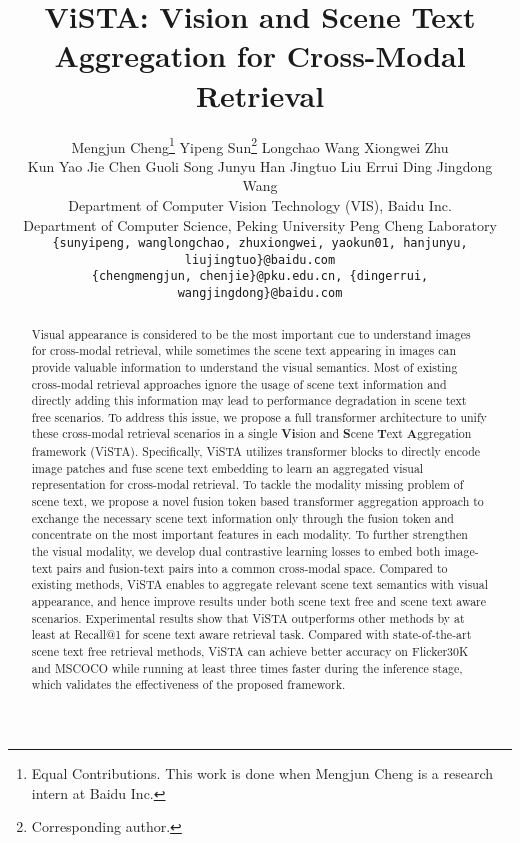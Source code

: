 \documentclass[10pt,twocolumn,letterpaper]{article}
\begin{document}
\title{ViSTA: Vision and Scene Text Aggregation for Cross-Modal Retrieval}


\makeatletter
\newcommand{\printfnsymbol}[1]{\textsuperscript{\@fnsymbol{#1}}}
\makeatother

\author{Mengjun Cheng\thanks{\noindent Equal Contributions. This work is done when Mengjun Cheng is a research intern at Baidu Inc.} \quad Yipeng Sun\printfnsymbol{1}\thanks{Corresponding author.} \quad Longchao Wang \quad Xiongwei Zhu \\
\quad Kun Yao \quad Jie Chen \quad Guoli Song \quad Junyu Han \quad Jingtuo Liu \quad Errui Ding \quad Jingdong Wang\\
Department of Computer Vision Technology (VIS), Baidu Inc. \\
\quad Department of Computer Science, Peking University \quad Peng Cheng Laboratory\\
{\tt\small \{sunyipeng, wanglongchao, zhuxiongwei, yaokun01, hanjunyu, liujingtuo\}@baidu.com}\\
{\tt\small \{chengmengjun, chenjie\}@pku.edu.cn, \tt\small \{dingerrui, wangjingdong\}@baidu.com}}
\maketitle

\begin{abstract}
Visual appearance is considered to be the most important cue to understand images for cross-modal retrieval, while sometimes the scene text appearing in images can provide valuable information to understand the visual semantics. Most of existing cross-modal retrieval approaches ignore the usage of scene text information and directly adding this information may lead to performance degradation in scene text free scenarios. To address this issue, we propose a full transformer architecture to unify these cross-modal retrieval scenarios in a single \textbf{Vi}sion and \textbf{S}cene \textbf{T}ext \textbf{A}ggregation framework (ViSTA). Specifically, ViSTA utilizes transformer blocks to directly encode image patches and fuse scene text embedding to learn an aggregated visual representation for cross-modal retrieval. To tackle the modality missing problem of scene text, we propose a novel fusion token based transformer aggregation approach to exchange the necessary scene text information only through the fusion token and concentrate on the most important features in each modality. To further strengthen the visual modality, we develop dual contrastive learning losses to embed both image-text pairs and fusion-text pairs into a common cross-modal space. Compared to existing methods, ViSTA enables to aggregate relevant scene text semantics with visual appearance, and hence improve results under both scene text free and scene text aware scenarios. Experimental results show that ViSTA outperforms other methods by at least  at Recall@1 for scene text aware retrieval task. Compared with state-of-the-art scene text free retrieval methods, ViSTA can achieve better accuracy on Flicker30K and MSCOCO while running at least three times faster during the inference stage, which validates the effectiveness of the proposed framework.
\end{abstract}
\end{document}
